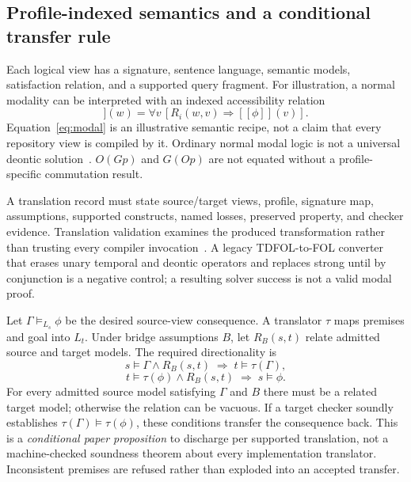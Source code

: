 \documentclass{article}
\begin{document}
\subsection{Profile-indexed semantics and a conditional transfer rule}
Each logical view has a signature, sentence language, semantic models, satisfaction relation, and a supported query fragment. For illustration, a normal modality can be interpreted with an indexed accessibility relation
\begin{equation}
[\![\Box_i\phi]\!](w)=\forall v\,[R_i(w,v)\Rightarrow[\![\phi]\!](v)].
\label{eq:modal}
\end{equation}
Equation~\ref{eq:modal} is an illustrative semantic recipe, not a claim that every repository view is compiled by it. Ordinary normal modal logic is not a universal deontic solution~\citep{benzmuller2020logikey}. $O(Gp)$ and $G(Op)$ are not equated without a profile-specific commutation result.

A translation record must state source/target views, profile, signature map, assumptions, supported constructs, named losses, preserved property, and checker evidence. Translation validation examines the produced transformation rather than trusting every compiler invocation~\citep{pnueli1998translation}. A legacy TDFOL-to-FOL converter that erases unary temporal and deontic operators and replaces strong until by conjunction is a negative control; a resulting solver success is not a valid modal proof.

Let $\Gamma\models_{L_s}\phi$ be the desired source-view consequence. A translator $\tau$ maps premises and goal into $L_t$. Under bridge assumptions $B$, let $R_B(s,t)$ relate admitted source and target models. The required directionality is
\begin{equation}
s\models\Gamma\land R_B(s,t)\;\Rightarrow\; t\models\tau(\Gamma),
\label{eq:prem}
\end{equation}
\begin{equation}
t\models\tau(\phi)\land R_B(s,t)\;\Rightarrow\; s\models\phi.
\label{eq:goal}
\end{equation}
For every admitted source model satisfying $\Gamma$ and $B$ there must be a related target model; otherwise the relation can be vacuous. If a target checker soundly establishes $\tau(\Gamma)\models\tau(\phi)$, these conditions transfer the consequence back. This is a \emph{conditional paper proposition} to discharge per supported translation, not a machine-checked soundness theorem about every implementation translator. Inconsistent premises are refused rather than exploded into an accepted transfer.
\end{document}
